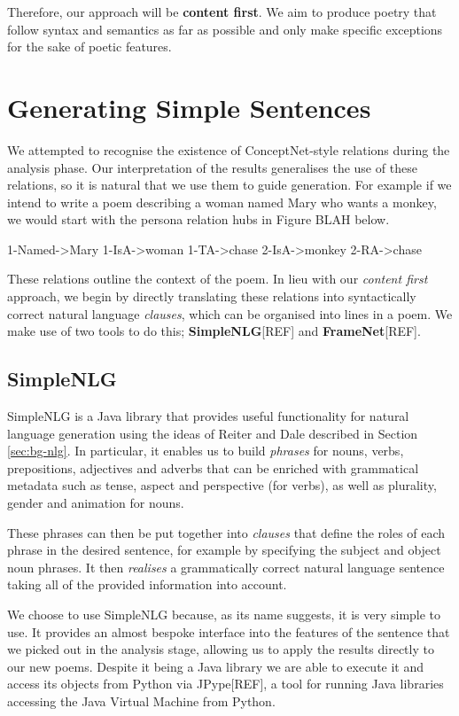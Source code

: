 Therefore, our approach will be \textbf{content first}. We aim to produce poetry that follow syntax and semantics as far as possible and only make specific exceptions for the sake of poetic features.


\section{Generating Simple Sentences}
\label{sec:build}
We attempted to recognise the existence of ConceptNet-style relations during the analysis phase. Our interpretation of the results generalises the use of these relations, so it is natural that we use them to guide generation. For example if we intend to write a poem describing a woman named Mary who wants a monkey, we would start with the persona relation hubs in Figure BLAH below.

1-Named->Mary
1-IsA->woman
1-TA->chase
2-IsA->monkey
2-RA->chase

These relations outline the context of the poem. In lieu with our \textit{content first} approach, we begin by directly translating these relations into syntactically correct natural language \textit{clauses}, which can be organised into lines in a poem. We make use of two tools to do this; \textbf{SimpleNLG}[REF] and \textbf{FrameNet}[REF].

\subsection{SimpleNLG}
SimpleNLG is a Java library that provides useful functionality for natural language generation using the ideas of Reiter and Dale described in Section \ref{sec:bg-nlg}. In particular, it enables us to build \textit{phrases} for nouns, verbs, prepositions, adjectives and adverbs that can be enriched with grammatical metadata such as tense, aspect and perspective (for verbs), as well as plurality, gender and animation for nouns.

These phrases can then be put together into \textit{clauses} that define the roles of each phrase in the desired sentence, for example by specifying the subject and object noun phrases. It then \textit{realises} a grammatically correct natural language sentence taking all of the provided information into account.

We choose to use SimpleNLG because, as its name suggests, it is very simple to use. It provides an almost bespoke interface into the features of the sentence that we picked out in the analysis stage, allowing us to apply the results directly to our new poems. Despite it being a Java library we are able to execute it and access its objects from Python via JPype[REF], a tool for running Java libraries accessing the Java Virtual Machine from Python.

